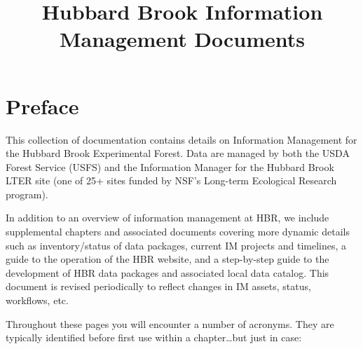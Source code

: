 \documentclass[
  letterpaper,
  DIV=11,
  numbers=noendperiod]{scrreprt}
\title{Hubbard Brook Information Management Documents}
\author{}
\date{}
\renewcommand*\contentsname{Table of contents}
\newcommand\contentsname{Table of contents}
\begin{document}
\maketitle

\renewcommand*\contentsname{Table of contents}
{
\hypersetup{linkcolor=}
\setcounter{tocdepth}{2}
\tableofcontents
}


\chapter*{Preface}\label{preface}


This collection of documentation contains details on Information
Management for the Hubbard Brook Experimental Forest. Data are managed
by both the USDA Forest Service (USFS) and the Information Manager for
the Hubbard Brook LTER site (one of 25+ sites funded by NSF's Long-term
Ecological Research program).

In addition to an overview of information management at HBR, we include
supplemental chapters and associated documents covering more dynamic
details such as inventory/status of data packages, current IM projects
and timelines, a guide to the operation of the HBR website, and a
step-by-step guide to the development of HBR data packages and
associated local data catalog. This document is revised periodically to
reflect changes in IM assets, status, workflows, etc.

Throughout these pages you will encounter a number of acronyms. They are
typically identified before first use within a chapter\ldots but just in
case:
\end{document}
